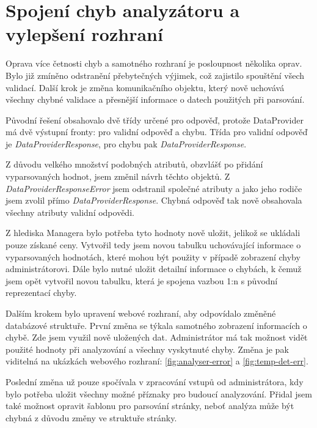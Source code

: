 \documentclass[thesis=B,czech]{FITthesis}[2012/06/26]
\begin{document}
\newpage 
\section{Spojení chyb analyzátoru a vylepšení rozhraní}
Oprava více četnosti chyb a samotného rozhraní je posloupnost několika oprav. 
Bylo již zmíněno odstranění přebytečných výjimek, což zajistilo spouštění všech validací. 
Další krok je změna komunikačního objektu, který nově uchovává všechny chybné validace a přesnější informace
o datech použitých při parsování.
\par
Původní řešení obsahovalo dvě třídy určené pro odpověď, protože DataProvider má dvě výstupní fronty: pro validní odpověď a chybu. 
Třída pro validní odpověď je \textit{DataProviderResponse}, pro chybu pak \textit{DataProviderResponse}.
\par
Z důvodu velkého množství podobných atributů, obzvlášť po přidání vyparsovaných hodnot, jsem změnil návrh těchto objektů.
Z \textit{DataProviderResponseError} jsem odstranil společné atributy a jako jeho rodiče jsem zvolil přímo \textit{DataProviderResponse}.
Chybná odpověď tak nově obsahovala všechny atributy validní odpovědi. 
\par
Z hlediska Managera bylo potřeba tyto hodnoty nově uložit, jelikož se ukládali pouze získané ceny. Vytvořil tedy jsem novou tabulku
uchovávající informace o vyparsovaných hodnotách, které mohou být použity v případě zobrazení chyby administrátorovi.
Dále bylo nutné uložit detailní informace o chybách, k čemuž jsem opět vytvořil novou tabulku, která je spojena vazbou 1:n s původní
reprezentací chyby.
\par
Dalším krokem bylo upravení webové rozhraní, aby odpovídalo změněné databázové struktuře. První změna se týkala samotného zobrazení
informacích o chybě. Zde jsem využil nově uložených dat. Administrátor má tak možnost vidět použité hodnoty při analyzování a všechny
vyskytnuté chyby. Změna je pak viditelná na ukázkách webového rozhraní: \ref{fig:analyser-error} a \ref{fig:temp-det-err}.
\par
Poslední změna už pouze spočívala v zpracování vstupů od administrátora, kdy bylo potřeba uložit všechny možné příznaky pro 
budoucí analyzování. Přidal jsem také možnost opravit šablonu pro parsování stránky, neboť analýza může být chybná z důvodu změny ve struktuře stránky.
\par
\end{document}
